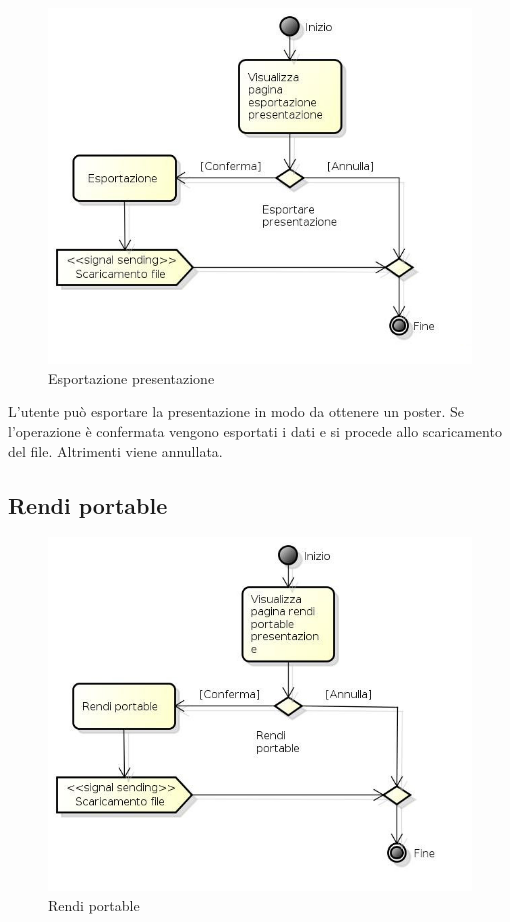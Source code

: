 \begin{figure}[h!]
		\centering
		\includegraphics[scale=.5]{img/Esporta_presentazione.jpg}
		\caption{Esportazione presentazione}
		\label{fig:Esportazione_presentazione}
\end{figure}

L'utente può esportare la presentazione in modo da ottenere un poster. Se l'operazione è confermata vengono esportati i dati e si procede allo scaricamento del file. Altrimenti viene annullata.

\newpage

\subsection{Rendi portable}

\begin{figure}[h!]
		\centering
		\includegraphics[scale=.5]{img/Rendi_portable.jpg}
		\caption{Rendi portable}
		\label{fig:Rendi_portable}
\end{figure}

